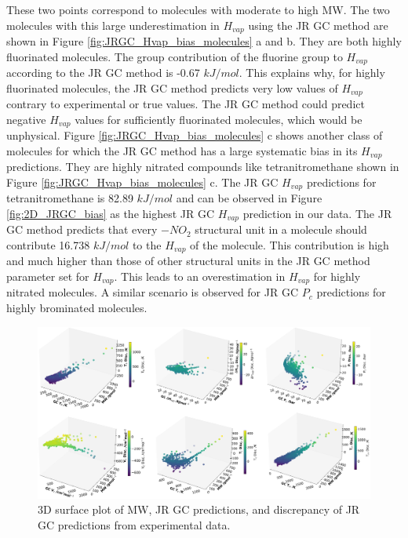 \documentclass[journal=jacsat,manuscript=article]{achemso}
\begin{document}
These two points correspond to molecules with moderate to high MW. The two molecules with this large underestimation in  $H_{vap}$ using the JR GC method are shown in Figure \ref{fig:JRGC_Hvap_bias_molecules} a and b. They are both highly fluorinated molecules. The group contribution of the fluorine group to $H_{vap}$ according to the JR GC method is -0.67 $kJ/mol$. This explains why, for highly fluorinated molecules, the JR GC method predicts very low values of $H_{vap}$ contrary to experimental or true values. The JR GC method could predict negative $H_{vap}$ values for sufficiently fluorinated molecules, which would be unphysical. Figure \ref{fig:JRGC_Hvap_bias_molecules} c shows another class of molecules for which the JR GC method has a large systematic bias in its $H_{vap}$ predictions. They are highly nitrated compounds like tetranitromethane shown in Figure \ref{fig:JRGC_Hvap_bias_molecules} c. The JR GC $H_{vap}$ predictions for tetranitromethane is 82.89 $kJ/mol$ and can be observed in Figure \ref{fig:2D_JRGC_bias} as the highest JR GC $H_{vap}$ prediction in our data. The JR GC method predicts that every $-NO_2$ structural unit in a molecule should contribute 16.738 $kJ/mol$ to the $H_{vap}$ of the molecule. This contribution is high and much higher than those of other structural units in the JR GC method parameter set for $H_{vap}$. This leads to an overestimation in $H_{vap}$ for highly nitrated molecules.
A similar scenario is observed for JR GC $P_c$ predictions for highly brominated molecules.  


\begin{figure}[H]
    \centering
    \includegraphics[width=1.1\linewidth]{images/3D_gc_mw_exp.png}
    \caption{3D surface plot of MW, JR GC predictions, and discrepancy of JR GC predictions from experimental data.}
    \label{fig:3D_JRGC_MW_disc}
\end{figure}
\end{document}
